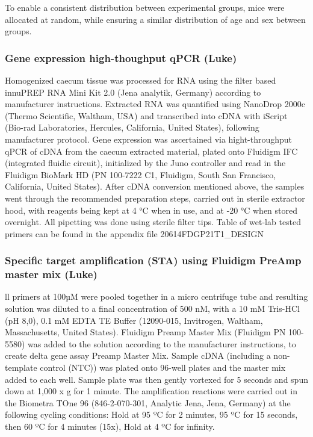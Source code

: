\documentclass[
]{article}
\begin{document}
To enable a consistent distribution between experimental groups, mice
were allocated at random, while ensuring a similar distribution of age
and sex between groups.

\hypertarget{gene-expression-high-thoughput-qpcr-luke}{%
\subsubsection{Gene expression high-thoughput qPCR
(Luke)}\label{gene-expression-high-thoughput-qpcr-luke}}

Homogenized caecum tissue was processed for RNA using the filter based
innuPREP RNA Mini Kit 2.0 (Jena analytik, Germany) according to
manufacturer instructions. Extracted RNA was quantified using NanoDrop
2000c (Thermo Scientific, Waltham, USA) and transcribed into cDNA with
iScript (Bio-rad Laboratories, Hercules, California, United States),
following manufacturer protocol. Gene expression was ascertained via
hight-throughput qPCR of cDNA from the caecum extracted material, plated
onto Fluidigm IFC (integrated fluidic circuit), initialized by the Juno
controller and read in the Fluidigm BioMark HD (PN 100-7222 C1,
Fluidigm, South San Francisco, California, United States). After cDNA
conversion mentioned above, the samples went through the recommended
preparation steps, carried out in sterile extractor hood, with reagents
being kept at 4 °C when in use, and at -20 °C when stored overnight. All
pipetting was done using sterile filter tips. Table of wet-lab tested
primers can be found in the appendix file 20614FDGP21T1\_DESIGN

\hypertarget{specific-target-amplification-sta-using-fluidigm-preamp-master-mix-luke}{%
\subsubsection{Specific target amplification (STA) using Fluidigm PreAmp
master mix
(Luke)}\label{specific-target-amplification-sta-using-fluidigm-preamp-master-mix-luke}}

ll primers at 100µM were pooled together in a micro centrifuge tube and
resulting solution was diluted to a final concentration of 500 nM, with
a 10 mM Tris-HCl (pH 8,0), 0.1 mM EDTA TE Buffer (12090-015, Invitrogen,
Waltham, Massachusetts, United States). Fluidigm Preamp Master Mix
(Fluidigm PN 100-5580) was added to the solution according to the
manufacturer instructions, to create delta gene assay Preamp Master Mix.
Sample cDNA (including a non-template control (NTC)) was plated onto
96-well plates and the master mix added to each well. Sample plate was
then gently vortexed for 5 seconds and spun down at 1,000 x g for 1
minute. The amplification reactions were carried out in the Biometra
TOne 96 (846-2-070-301, Analytic Jena, Jena, Germany) at the following
cycling conditions: Hold at 95 ºC for 2 minutes, 95 ºC for 15 seconds,
then 60 ºC for 4 minutes (15x), Hold at 4 ºC for infinity.
\end{document}

